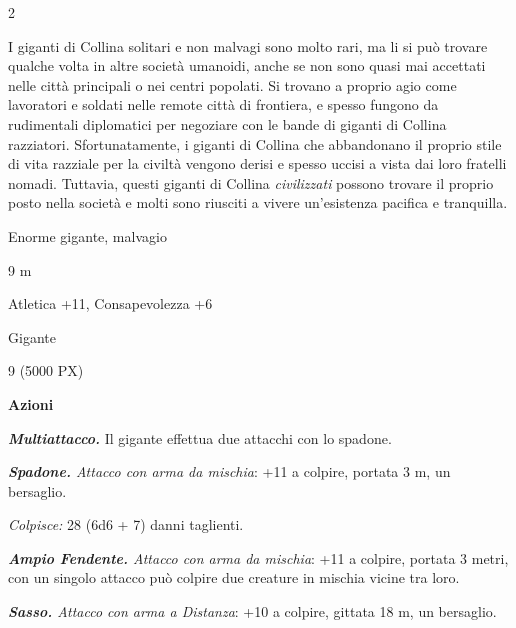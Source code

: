 \begin{multicols}{2}
{I giganti di Collina solitari e non malvagi sono molto rari, ma li si può trovare qualche volta in altre società umanoidi, anche se non sono quasi mai accettati nelle città principali o nei centri popolati. Si trovano a proprio agio come lavoratori e soldati nelle remote città di frontiera, e spesso fungono da rudimentali diplomatici per negoziare con le bande di giganti di Collina razziatori. Sfortunatamente, i giganti di Collina che abbandonano il proprio stile di vita razziale per la civiltà vengono derisi e spesso uccisi a vista dai loro fratelli nomadi. Tuttavia, questi giganti di Collina \emph{civilizzati} possono trovare il proprio posto nella società e molti sono riusciti a vivere un'esistenza pacifica e tranquilla.

\begin{description}[noitemsep, topsep=0pt, parsep=0pt, partopsep=0pt, itemsep=1pt, leftmargin=2.35cm,  labelwidth=2.2cm, itemindent=0cm, listparindent=0pt] %
\setlength{\baselineskip}{10pt}
\item[\textbf{Taglia/Tipo}] Enorme gigante, malvagio
\item[\textbf{Caratt.}] 
\item[\textbf{Punti Ferita}] 
\item[\textbf{Movimento}] 9 m
\item[\textbf{Tiri Salvez.}] 
\item[\textbf{Comp.}] Atletica +11, Consapevolezza +6
\item[\textbf{Linguaggi}] Gigante
\item[\textbf{Sfida}] 9 (5000 PX)
\end{description}
\smallskip

\textbf{Azioni}

\emph{\textbf{Multiattacco.}} Il gigante effettua due attacchi con lo spadone.

\emph{\textbf{Spadone.} Attacco con arma da mischia}: +11 a colpire, portata 3 m, un bersaglio.

\emph{Colpisce:} 28 (6d6 + 7) danni taglienti.

\emph{\textbf{Ampio Fendente.} Attacco con arma da mischia}: +11 a colpire, portata 3 metri, con un singolo attacco può colpire due creature in mischia vicine tra loro.

\emph{\textbf{Sasso.} Attacco con arma a Distanza}: +10 a colpire, gittata 18 m, un bersaglio.

}
\end{multicols}
